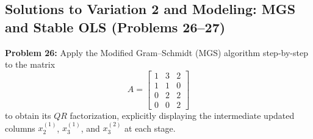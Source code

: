 \documentclass[11pt, letterpaper]{article}
\theoremstyle{definition}
\theoremstyle{remark}
\begin{document}
\subsection{Solutions to Variation 2 and Modeling: MGS and Stable OLS (Problems 26--27)}

\textbf{Problem 26:} Apply the Modified Gram--Schmidt (MGS) algorithm step-by-step to the matrix
\[
    A = \begin{bmatrix}
        1 & 3 & 2 \\
        1 & 1 & 0 \\
        0 & 2 & 2 \\
        0 & 0 & 2
    \end{bmatrix}
\]
to obtain its $QR$ factorization, explicitly displaying the intermediate updated columns $x_2^{(1)}$, $x_3^{(1)}$, and $x_3^{(2)}$ at each stage.
\end{document}
